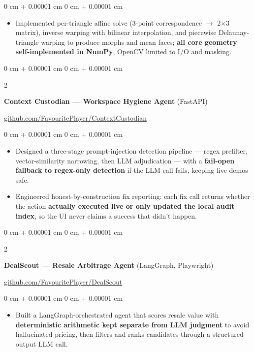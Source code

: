 \documentclass[10pt, letterpaper]{article}
\newenvironment{highlights}{
    \begin{itemize}[
        topsep=0.3 cm,
        parsep=0.05 cm,
        partopsep=0pt,
        itemsep=0.02 cm,
        leftmargin=0 cm + 10pt
    ]
}{
    \end{itemize}
} %
\newenvironment{onecolentry}{
    \begin{adjustwidth}{
        0 cm + 0.00001 cm
    }{
        0 cm + 0.00001 cm
    }
}{
    \end{adjustwidth}
} %
\newenvironment{extendedtwocolentry}[2][]{
    \onecolentry
    \def\secondColumn{#2}
    \setcolumnwidth{\fill, 8 cm}
    \begin{paracol}{2}
}{
    \switchcolumn \raggedleft \secondColumn
    \end{paracol}
    \endonecolentry
}
\begin{document}
        \vspace{0.10 cm}
        \begin{onecolentry}
            \begin{highlights}
                \item Implemented per-triangle affine solve (3-point correspondence $\rightarrow$ 2$\times$3 matrix), inverse warping with bilinear interpolation, and piecewise Delaunay-triangle warping to produce morphs and mean faces; \textbf{all core geometry self-implemented in NumPy}, OpenCV limited to I/O and masking.
            \end{highlights}
        \end{onecolentry}

        \begin{extendedtwocolentry}{
            \href{https://github.com/FavouritePlayer/ContextCustodian}{github.com/FavouritePlayer/ContextCustodian}
        }
            \textbf{Context Custodian — Workspace Hygiene Agent} (FastAPI)
        \end{extendedtwocolentry}

        \vspace{0.10 cm}
        \begin{onecolentry}
            \begin{highlights}
                \item Designed a three-stage prompt-injection detection pipeline — regex prefilter, vector-similarity narrowing, then LLM adjudication — with a \textbf{fail-open fallback to regex-only detection} if the LLM call fails, keeping live demos safe.
                \item Engineered honest-by-construction fix reporting: each fix call returns whether the action \textbf{actually executed live or only updated the local audit index}, so the UI never claims a success that didn't happen.
            \end{highlights}
        \end{onecolentry}

        \begin{extendedtwocolentry}{
            \href{https://github.com/FavouritePlayer/DealScout}{github.com/FavouritePlayer/DealScout}
        }
            \textbf{DealScout — Resale Arbitrage Agent} (LangGraph, Playwright)
        \end{extendedtwocolentry}

        \vspace{0.10 cm}
        \begin{onecolentry}
            \begin{highlights}
                \item Built a LangGraph-orchestrated agent that scores resale value with \textbf{deterministic arithmetic kept separate from LLM judgment} to avoid hallucinated pricing, then filters and ranks candidates through a structured-output LLM call.
            \end{highlights}
        \end{onecolentry}
\end{document}
